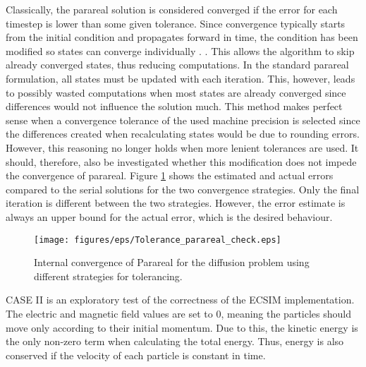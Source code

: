  Classically, the parareal solution is considered converged if the error for each timestep is lower than some given tolerance. Since convergence typically starts from the initial condition and propagates forward in time, the condition has been modified so states can converge individually \cite{d_samaddar_parallelization_2010}. . This allows the algorithm to skip already converged states, thus reducing computations. In the standard parareal formulation, all states must be updated with each iteration. This, however, leads to possibly wasted computations when most states are already converged since differences would not influence the solution much. This method makes perfect sense when a convergence tolerance of the used machine precision is selected since the differences created when recalculating states would be due to rounding errors. However, this reasoning no longer holds when more lenient tolerances are used. It should, therefore, also be investigated whether this modification does not impede the convergence of parareal. Figure \ref{fig: CN-parareal-convergence-tolerance} shows the estimated and actual errors compared to the serial solutions for the two convergence strategies. Only the final iteration is different between the two strategies. However, the error estimate is always an upper bound for the actual error, which is the desired behaviour.
\begin{figure}[h]
    \centering
    \texttt{[image: figures/eps/Tolerance\_parareal\_check.eps]}
    \caption{Internal convergence of Parareal for the diffusion problem using different strategies for tolerancing.}
    \label{fig: CN-parareal-convergence-tolerance}
\end{figure}

CASE II is an exploratory test of the correctness of the ECSIM implementation. The electric and magnetic field values are set to 0, meaning the particles should move only according to their initial momentum. Due to this, the kinetic energy is the only non-zero term when calculating the total energy. Thus, energy is also conserved if the velocity of each particle is constant in time.

